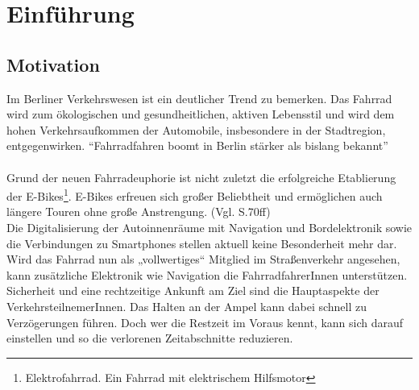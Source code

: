 \chapter{\label{chap:einleitung}Einführung}
\section{Motivation}
Im Berliner Verkehrswesen ist ein deutlicher Trend zu bemerken. Das Fahrrad wird zum ökologischen und gesundheitlichen, aktiven Lebensstil und wird dem hohen Verkehrsaufkommen der Automobile, insbesondere in der Stadtregion, entgegenwirken. “Fahrradfahren boomt in Berlin stärker als bislang bekannt”\cite{Mopo}\\\\
Grund der neuen Fahrradeuphorie ist nicht zuletzt die erfolgreiche Etablierung der E-Bikes\footnote{ Elektrofahrrad. Ein Fahrrad mit elektrischem Hilfsmotor}. E-Bikes erfreuen sich großer Beliebtheit und ermöglichen auch längere Touren ohne große Anstrengung. (Vgl. \cite{ebikes} S.70ff)\\ 
Die Digitalisierung der Autoinnenräume mit Navigation und Bordelektronik sowie die Verbindungen zu \glspl{Smartphone} stellen aktuell keine Besonderheit mehr dar. Wird das Fahrrad nun als „vollwertiges“ Mitglied im Straßenverkehr angesehen, kann zusätzliche Elektronik wie Navigation die FahrradfahrerInnen unterstützen. Sicherheit und eine rechtzeitige Ankunft am Ziel sind die Hauptaspekte der VerkehrsteilnemerInnen. Das Halten an der Ampel kann dabei schnell zu Verzögerungen führen. Doch wer die Restzeit im Voraus kennt, kann sich darauf einstellen und so die verlorenen Zeitabschnitte reduzieren.
